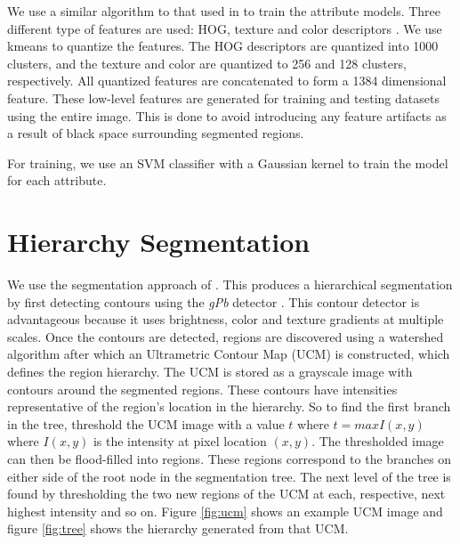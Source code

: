 \documentclass[10pt,twocolumn,letterpaper]{article}
\begin{document}
We use a similar algorithm to that used in \cite{farhadi09} to train the attribute models. Three different type of features are used: HOG, texture and color descriptors \cite{farhadi09}.  We use kmeans to quantize the features. The HOG descriptors are quantized into 1000 clusters, and the texture and color are quantized to 256 and 128 clusters, respectively. All quantized features are concatenated to form a 1384 dimensional feature.  These low-level features are generated for training and testing datasets using the entire image.  This is done to avoid introducing any feature artifacts as a result of black space surrounding segmented regions.

For training, we use an SVM classifier with a Gaussian kernel to train
the model for each attribute.  




\section{Hierarchy Segmentation}
\label{sec:segmentation}

We use the segmentation approach of \cite{arbelaez09}.  This
produces a hierarchical segmentation by first detecting contours
using the \emph{gPb} detector \cite{maire08}.  This contour detector
is advantageous because it uses brightness, color and texture
gradients at multiple scales.  Once the contours are
detected, regions are discovered using a watershed algorithm after
which an Ultrametric Contour Map (UCM) is constructed, which defines
the region hierarchy.  The UCM is stored as a grayscale image with
contours around the segmented regions.  These contours have intensities
representative of the region's location in the hierarchy.  So to find
the first branch in the tree, threshold the UCM image with a value
$t$ where $t = max{I(x,y)}$ where $I(x,y)$ is the intensity at pixel
location $(x,y)$.  The thresholded image can then be flood-filled into
regions.  These regions correspond to the branches on either side of
the root node in the segmentation tree.  The next level of the tree is
found by thresholding the two new regions of the UCM at each, respective,
next highest intensity and so on.
Figure \ref{fig:ucm} shows an example UCM image and figure \ref{fig:tree}
shows the hierarchy generated from that UCM.
\end{document}
